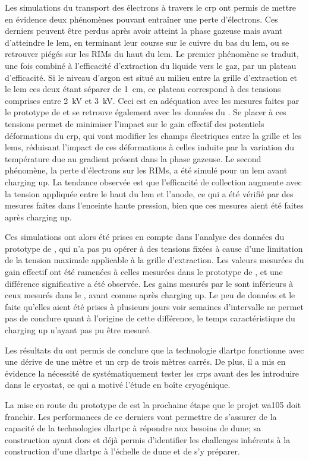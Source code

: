 Les simulations du transport des électrons à travers le \gls{crp} ont permis de mettre en évidence deux phénomènes pouvant entraîner une perte d'électrons. Ces derniers peuvent être perdus après avoir atteint la phase gazeuse mais avant d'atteindre le \gls{lem}, en terminant leur course sur le cuivre du bas du \gls{lem}, ou se retrouver piégés sur les RIMs du haut du \gls{lem}. Le premier phénomène se traduit, une fois combiné à l'efficacité d'extraction du liquide vers le gaz, par un plateau d'efficacité. Si le niveau d'argon est situé au milieu entre la grille d'extraction et le \gls{lem} ces deux étant séparer de \SI{1}{\centi\meter}, ce plateau correspond à des tensions comprises entre \SI{2}{\kilo\volt} et \SI{3}{\kilo\volt}. Ceci est en adéquation avec les mesures faites par le prototype de \threeL{} et se retrouve également avec les données du \TOO{}. Se placer à ces tensions permet de minimiser l'impact sur le gain effectif des potentiels déformations du \gls{crp}, qui vont modifier les champs électriques entre la grille et les \glspl{lem}, réduisant l'impact de ces déformations à celles induite par la variation du température due au gradient présent dans la phase gazeuse. Le second phénomène, la perte d'électrons sur les RIMs, a été simulé pour un \gls{lem} avant charging up. La tendance observée est que l'efficacité de collection augmente avec la tension appliquée entre le haut du \gls{lem} et l'anode, ce qui a été vérifié par des mesures faites dans l'enceinte haute pression, bien que ces mesures aient été faites après charging up.

Ces simulations ont alors été prises en compte dans l'analyse des données du prototype de \TOO{}, qui n'a pas pu opérer à des tensions fixées à cause d'une limitation de la tension maximale applicable à la grille d'extraction. Les valeurs mesurées du gain effectif ont été ramenées à celles mesurées dans le prototype de \threeL{}, et une différence significative a été observée. Les gains mesurés par le \TOO{} sont inférieurs à ceux mesurés dans le \threeL{}, avant comme après charging up. Le peu de données et le faite qu'elles aient été prises à plusieurs jours voir semaines d'intervalle ne permet pas de conclure quant à l'origine de cette différence, le temps caractéristique du charging up n'ayant pas pu être mesuré.

Les résultats du \TOO{} ont permis de conclure que la technologie \gls{dlartpc} fonctionne avec une dérive de une mètre et un \gls{crp} de trois mètres carrés. De plus, il a mis en évidence la nécessité de systématiquement tester les \glspl{crp} avant des les introduire dans le cryostat, ce qui a motivé l'étude en boîte cryogénique.

La mise en route du prototype de \SSS{} est la prochaine étape que le projet \gls{wa105} doit franchir. Les performances de ce derniers vont permettre de s'assurer de la capacité de la technologies \gls{dlartpc} à répondre aux besoins de \gls{dune}; sa construction ayant dors et déjà permis d'identifier les challenges inhérents à la construction d'une \gls{dlartpc} à l'échelle de \gls{dune} et de s'y préparer.